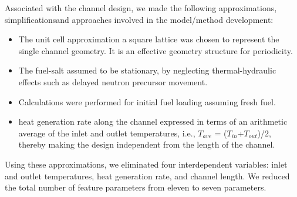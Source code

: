     Associated with the channel design, we made the following approximations, simplifications\DIFaddbegin \DIFadd{, }\DIFaddend and approaches involved in the model/method development:
    \begin{itemize}
    	\item The unit cell approximation \DIFdelbegin {}\DIFdelend \DIFaddbegin {}\DIFaddend a square lattice \DIFaddbegin {}\DIFaddend was chosen to represent the single channel geometry. It is an effective geometry structure for periodicity.
    	\item The fuel-salt \DIFdelbegin {}\DIFdelend \DIFaddbegin {}\DIFaddend assumed to be stationary, by neglecting thermal-hydraulic effects such as delayed neutron precursor movement.
    	\item Calculations were performed for initial fuel loading assuming fresh fuel.
    	\item \DIFdelbegin {}\DIFdelend \DIFaddbegin {}\DIFaddend heat generation	rate along the channel \DIFdelbegin {}\DIFdelend \DIFaddbegin {}\DIFaddend expressed in terms of an arithmetic average of the inlet and outlet temperatures, i.e., $T_{ave}$ = ($T_{in}$+$T_{out}$)/2, thereby \DIFdelbegin \DIFdel{, }\DIFdelend making the design independent from the length	of the channel.
    \end{itemize}

    Using these approximations, we eliminated four interdependent variables: inlet and outlet temperatures, heat generation rate, and channel length\DIFdelbegin {}\DIFdelend . We reduced the total number of feature parameters from eleven to seven parameters.

